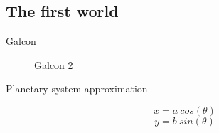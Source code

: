 \documentclass{beamer}
\begin{document}
\subsection{The first world}
\begin{frame}{Galcon}
\begin{figure}[H]
\noindent{}
\caption{Galcon 2}
\end{figure}
\end{frame}
\begin{frame}{Planetary system approximation}
\begin{figure}[H]
\begin{minipage}{.65\textwidth}
\noindent{}
\end{minipage}
\begin{minipage}{.3\textwidth}
$$x = a \: cos(\theta)$$
           $$y = b \: sin(\theta)$$
\end{minipage}
\end{figure}
\end{frame}
\end{document}
